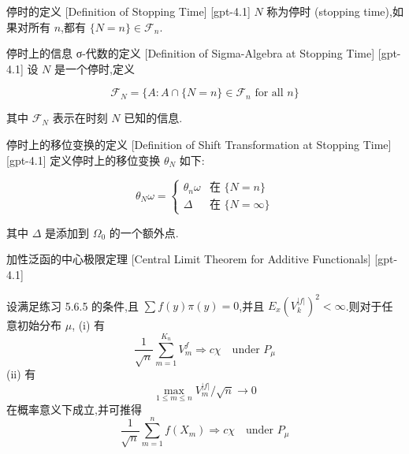 \documentclass[UTF8]{ctexart}
\begin{document}
    
    
    \begin{dfn}
        {停时的定义}
        [Definition of Stopping Time]
        [gpt-4.1]
        $N$ 称为停时 (stopping time),如果对所有 $n$,都有 $\{ N = n \} \in \mathcal{F}_n$.
    \end{dfn}
    
    
    
    \begin{dfn}
        {停时上的信息 σ-代数的定义}
        [Definition of Sigma-Algebra at Stopping Time]
        [gpt-4.1]
        设 $N$ 是一个停时,定义

\[
\mathcal{F}_N = \{ A : A \cap \{ N = n \} \in \mathcal{F}_n \text{ for all } n \}
\]

其中 $\mathcal{F}_N$ 表示在时刻 $N$ 已知的信息.
    \end{dfn}
    
    
    
    \begin{dfn}
        {停时上的移位变换的定义}
        [Definition of Shift Transformation at Stopping Time]
        [gpt-4.1]
        定义停时上的移位变换 $\theta_N$ 如下:

\[
\theta _ { N } \omega = \left\{
\begin{array}{ll}
\theta _ { n } \omega & \text{在 } \{ N = n \} \\
\Delta & \text{在 } \{ N = \infty \}
\end{array}
\right.
\]

其中 $\Delta$ 是添加到 $\Omega_{0}$ 的一个额外点.
    \end{dfn}
    
    
    
    \begin{thm}
        {加性泛函的中心极限定理}
        [Central Limit Theorem for Additive Functionals]
        [gpt-4.1]
        
设满足练习 5.6.5 的条件,且 $\sum f(y) \pi(y) = 0$,并且 $E_{x}(V_{k}^{|f|})^{2} < \infty$.则对于任意初始分布 $\mu$,
(i) 有
\[
\frac{1}{\sqrt{n}} \sum_{m=1}^{K_{n}} V_{m}^{f} \Rightarrow c\chi \quad \text{under } P_{\mu}
\]
(ii) 有
\[
\max_{1 \leq m \leq n} V_{m}^{|f|} / \sqrt{n} \to 0
\]
在概率意义下成立,并可推得
\[
\frac{1}{\sqrt{n}} \sum_{m=1}^{n} f(X_{m}) \Rightarrow c\chi \quad \text{under } P_{\mu}
\]

    \end{thm}
    
\end{document}
